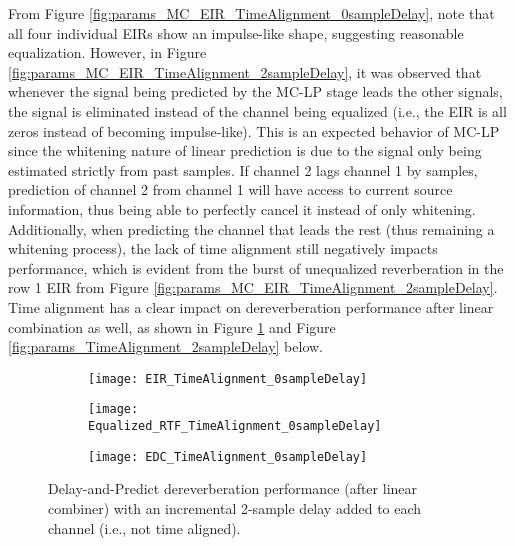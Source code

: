 From Figure \ref{fig:params_MC_EIR_TimeAlignment_0sampleDelay}, note that all four individual EIRs show an impulse-like shape, suggesting reasonable equalization. However, in Figure \ref{fig:params_MC_EIR_TimeAlignment_2sampleDelay}, it was observed that whenever the signal being predicted by the MC-LP stage leads the other signals, the signal is eliminated instead of the channel being equalized (i.e., the EIR is all zeros instead of becoming impulse-like). This is an expected behavior of MC-LP since the whitening nature of linear prediction is due to the signal only being estimated strictly from past samples. If channel 2 lags channel 1 by samples, prediction of channel 2 from channel 1 will have access to current source information, thus being able to perfectly cancel it instead of only whitening. Additionally, when predicting the channel that leads the rest (thus remaining a whitening process), the lack of time alignment still negatively impacts performance, which is evident from the burst of unequalized reverberation in the row 1 EIR from Figure \ref{fig:params_MC_EIR_TimeAlignment_2sampleDelay}. Time alignment has a clear impact on dereverberation performance after linear combination as well, as shown in Figure \ref{fig:params_TimeAlignment_0sampleDelay} and Figure \ref{fig:params_TimeAlignment_2sampleDelay} below.


\begin{figure}[H]
	\centering
	\begin{subfigure}[b]{0.32\textwidth}
		\centering
		\texttt{[image: EIR\_TimeAlignment\_0sampleDelay]}
	\end{subfigure}
	\hfill
	\begin{subfigure}[b]{0.32\textwidth}
		\centering
		\texttt{[image: Equalized\_RTF\_TimeAlignment\_0sampleDelay]}
	\end{subfigure}
	\hfill
	\begin{subfigure}[b]{0.32\textwidth}
		\centering
		\texttt{[image: EDC\_TimeAlignment\_0sampleDelay]}
	\end{subfigure}
	\hfill
	\caption{Delay-and-Predict dereverberation performance (after linear combiner) with an incremental 2-sample delay added to each channel (i.e., not time aligned).}
	\label{fig:params_TimeAlignment_0sampleDelay}
\end{figure}

